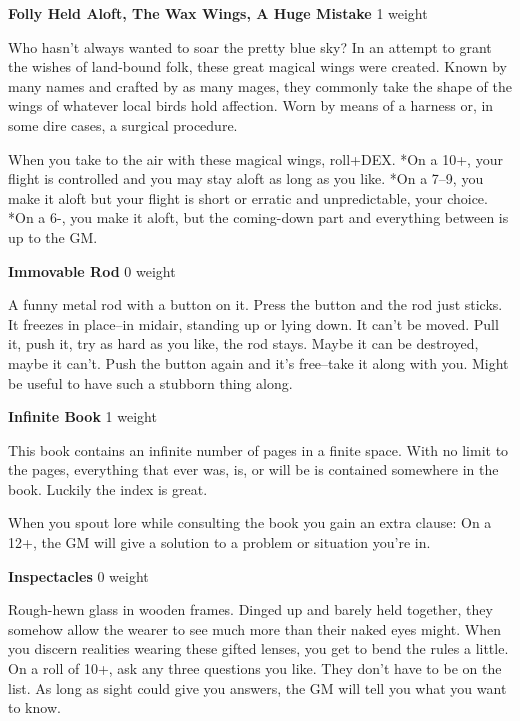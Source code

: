 {\noindent \bfseries Folly Held Aloft, The Wax Wings, A Huge Mistake} \hspace*{\fill} 1 weight

Who hasn't always wanted to soar the pretty blue sky? In an attempt to grant the wishes of land-bound folk, these great magical wings were created. Known by many names and crafted by as many mages, they commonly take the shape of the wings of whatever local birds hold affection. Worn by means of a harness or, in some dire cases, a surgical procedure.

When you take to the air with these magical wings, roll+DEX. *On a 10+, your flight is controlled and you may stay aloft as long as you like. *On a 7--9, you make it aloft but your flight is short or erratic and unpredictable, your choice. *On a 6-, you make it aloft, but the coming-down part and everything between is up to the GM.

{\noindent \bfseries Immovable Rod} \hspace*{\fill} 0 weight

A funny metal rod with a button on it. Press the button and the rod just sticks. It freezes in place--in midair, standing up or lying down. It can't be moved. Pull it, push it, try as hard as you like, the rod stays. Maybe it can be destroyed, maybe it can't. Push the button again and it's free--take it along with you. Might be useful to have such a stubborn thing along. 

{\noindent \bfseries Infinite Book} \hspace*{\fill} 1 weight

This book contains an infinite number of pages in a finite space. With no limit to the pages, everything that ever was, is, or will be is contained somewhere in the book. Luckily the index is great.

When you spout lore while consulting the book you gain an extra clause: On a 12+, the GM will give a solution to a problem or situation you're in.

{\noindent \bfseries Inspectacles} \hspace*{\fill} 0 weight

Rough-hewn glass in wooden frames. Dinged up and barely held together, they somehow allow the wearer to see much more than their naked eyes might. When you discern realities wearing these gifted lenses, you get to bend the rules a little. On a roll of 10+, ask any three questions you like. They don't have to be on the list. As long as sight could give you answers, the GM will tell you what you want to know.

